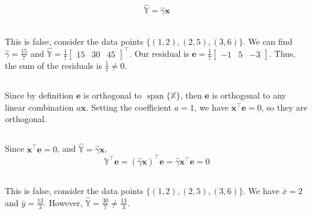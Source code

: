 \documentclass{article}
\newcommand{\X}{\mathbb{X}}
\newcommand{\Y}{\mathbb{Y}}
\DeclareMathOperator{\Span}{span}
\begin{document}
\section{}

\begin{gather}
    \hat{\Y} = \hat{\gamma} \bm{x}
\end{gather}

\subsection{}

This is false, consider the data points \(\{(1, 2), (2, 5), (3, 6)\}\).
We can find \(\hat{\gamma} = \frac{15}{7}\) and \(\hat{\Y} = \frac{1}{7}
\begin{bmatrix}
    15 & 30 & 45
\end{bmatrix}^\top\).
Our residual is \(\bm{e} = \frac{1}{7}
\begin{bmatrix}
    -1 & 5 & -3
\end{bmatrix}\).
Thus, the sum of the residuals is \(\frac{1}{7} \neq 0\).

\subsection{}

Since by definition \(\bm{e}\) is orthogonal to \(\Span\{\X\}\), then \(\bm{e}\) is orthogonal to any linear combination \(a\bm{x}\).
Setting the coefficient \(a = 1\), we have \(\bm{x}^\top \bm{e} = 0\), so they are orthogonal.

\subsection{}

Since \(\bm{x}^\top \bm{e} = 0\), and \(\hat{\Y} = \hat{\gamma} \bm{x}\),
\begin{equation}
    \Y^\top \bm{e} = (\hat{\gamma} \bm{x})^\top \bm{e} = \hat{\gamma} \bm{x}^\top \bm{e} = 0
\end{equation}

\subsection{}

This is false, consider the data points \(\{(1, 2), (2, 5), (3, 6)\}\).
We have \(\bar{x} = 2\) and \(\bar{y} = \frac{13}{3}\).
However, \(\hat{\Y} = \frac{30}{7} \neq \frac{13}{3}\).
\end{document}
